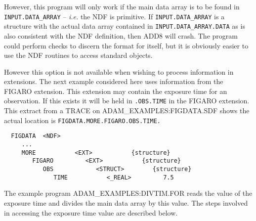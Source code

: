 However, this program will only work if the main data array is 
to be found in {\tt INPUT.DATA\_ARRAY} -- 
{\it i.e.} the NDF is primitive. If {\tt INPUT.DATA\_ARRAY} is a structure
with the actual data array contained in {\tt INPUT.DATA\_ARRAY.DATA} as is 
also consistent with the NDF definition, then ADD8 will crash.
The program could  perform checks to discern the format for itself, but
it is obviously easier to use the NDF routines to access standard objects.

However this option is not available when wishing to process information in 
extensions.
The next example considered here uses information from the FIGARO extension.
This  extension may contain the exposure time for an observation.
If this exists it will be held in {\tt.OBS.TIME} in the FIGARO extension.
This extract from a TRACE on ADAM\_EXAMPLES:FIGDATA.SDF shows the actual
location is {\tt FIGDATA.MORE.FIGARO.OBS.TIME.}
\begin{verbatim}
  FIGDATA  <NDF>
     ...
     MORE           <EXT>           {structure}
        FIGARO         <EXT>           {structure}
           OBS            <STRUCT>        {structure}
              TIME           <_REAL>         7.5
\end{verbatim}
The example program ADAM\_EXAMPLES:DIVTIM.FOR reads the value of the
exposure time and divides the main data array by this value. 
The steps involved in accessing the exposure time value are described 
below.

